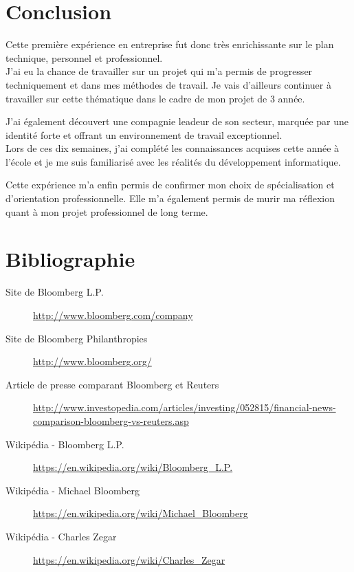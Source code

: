 \documentclass[11pt, oneside, titlepage, a4paper]{article}
\begin{document}
\section{Conclusion}
Cette première expérience en entreprise fut donc très enrichissante sur le plan technique, personnel et professionnel.
\\

J'ai eu la chance de travailler sur un projet qui m'a permis de progresser techniquement et dans mes méthodes de travail. Je vais d'ailleurs continuer à travailler sur cette thématique dans le cadre de mon projet de 3 année.

J'ai également découvert une compagnie leadeur de son secteur, marquée par une identité forte et offrant un environnement de travail exceptionnel.
\\

Lors de ces dix semaines, j'ai complété les connaissances acquises cette année à l'école et je me suis familiarisé avec les réalités du développement informatique.

Cette expérience m'a enfin permis de confirmer mon choix de spécialisation et d'orientation professionnelle. Elle m'a également permis de murir ma réflexion quant à mon projet professionnel de long terme.
\newpage
\section{Bibliographie}
\begin{description}
\item[Site de Bloomberg L.P.] \url{http://www.bloomberg.com/company}
\item[Site de Bloomberg Philanthropies] \url{http://www.bloomberg.org/}
\item[Article de presse comparant Bloomberg et Reuters] \url{http://www.investopedia.com/articles/investing/052815/financial-news-comparison-bloomberg-vs-reuters.asp}
\item[Wikipédia - Bloomberg L.P.] \url{https://en.wikipedia.org/wiki/Bloomberg_L.P.}
\item[Wikipédia - Michael Bloomberg] \url{https://en.wikipedia.org/wiki/Michael_Bloomberg}
\item[Wikipédia - Charles Zegar] \url{https://en.wikipedia.org/wiki/Charles_Zegar}
\end{description}
\end{document}
